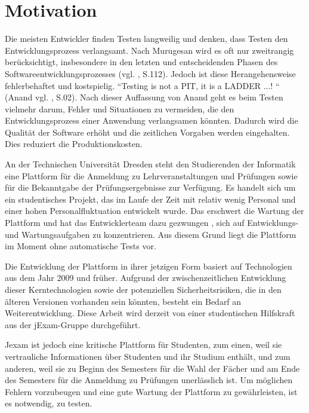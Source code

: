 \section{Motivation}

Die meisten Entwickler finden Testen langweilig und denken, dass Testen den
Entwicklungsprozess verlangsamt. Nach Murugesan  wird es oft nur zweitrangig
berücksichtigt, insbesondere in den letzten und entscheidenden Phasen des
Softwareentwicklungsprozesses (vgl. \cite{526394}, S.112). Jedoch ist diese
Herangehensweise fehlerbehaftet und kostspielig. “Testing is not a PIT, it is a
LADDER ...! “ (Anand vgl. \cite{anand12importance} , S.02). Nach dieser Auffassung von
Anand geht es beim Testen vielmehr darum, Fehler und Situationen zu vermeiden,
die den Entwicklungsprozess einer Anwendung verlangsamen könnten.
Dadurch wird die Qualität der Software erhöht und die zeitlichen Vorgaben
werden eingehalten. Dies reduziert die Produktionskosten.


An der Technischen Universität Dresden steht den Studierenden der Informatik eine
Plattform für die Anmeldung zu Lehrveranstaltungen und Prüfungen sowie für die
Bekanntgabe der Prüfungsergebnisse zur Verfügung. Es handelt sich um ein
studentisches Projekt, das im Laufe der Zeit mit relativ wenig Personal
und einer hohen Personalfluktuation entwickelt wurde.  Das erschwert die
Wartung der Plattform und hat das Entwicklerteam dazu gezwungen , sich auf
Entwicklungs- und Wartungsaufgaben zu konzentrieren. Aus diesem Grund liegt
die Plattform im Moment ohne automatische Tests vor.


Die Entwicklung der Plattform in ihrer jetzigen Form basiert auf Technologien aus
dem Jahr 2009 und früher. Aufgrund der zwischenzeitlichen Entwicklung dieser
Kerntechnologien sowie der potenziellen Sicherheitsrisiken, die in den älteren
Versionen vorhanden sein könnten, besteht ein Bedarf an Weiterentwicklung.
Diese Arbeit wird derzeit von einer studentischen Hilfskraft aus der jExam-Gruppe
durchgeführt.


Jexam ist jedoch eine kritische Plattform für Studenten, zum einen, weil sie
vertrauliche Informationen über Studenten und ihr Studium enthält, und zum
anderen, weil sie zu Beginn des Semesters für die Wahl der Fächer und am Ende
des Semesters für die Anmeldung zu Prüfungen unerlässlich ist. Um möglichen
Fehlern vorzubeugen und eine gute Wartung der Plattform zu gewährleisten, ist
es notwendig, zu testen.


